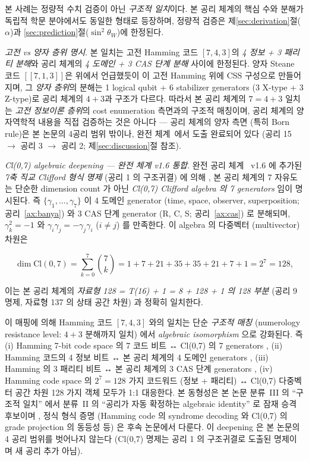 \documentclass[entropy,article,submit,pdftex,oneauthor]{Definitions/mdpi}
\begin{document}
본 사례는 정량적 수치 검증이 아닌 \emph{구조적 일치}이다. 본 공리 체계의 핵심 수와 분해가 독립적 학문 분야에서도 동일한 형태로 등장하며, 정량적 검증은 제\ref{sec:derivation}절($\alpha$)과 \ref{sec:prediction}절($\sin^2\theta_W$)에 한정된다.

\emph{고전 vs 양자 층위 명시}. 본 일치는 고전 Hamming 코드 $[7,4,3]$의 \emph{4 정보 + 3 패리티 분해}와 공리 체계의 \emph{4 도메인 + 3 CAS 단계 분해} 사이에 한정된다. 양자 Steane 코드 $[[7,1,3]]$은 위에서 언급했듯이 이 고전 Hamming 위에 CSS 구성으로 만들어지며, 그 \emph{양자 층위}의 분해는 1 logical qubit + 6 stabilizer generators (3 X-type + 3 Z-type)로 공리 체계의 $4+3$과 구조가 다르다. 따라서 본 공리 체계의 $7 = 4+3$ 일치는 \emph{고전 정보이론 층위}의 cost enumeration 측면과의 구조적 매칭이며, 공리 체계의 양자역학적 내용을 직접 검증하는 것은 아니다 --- 공리 체계의 양자 측면 (특히 Born rule)은 본 논문의 4공리 범위 밖이나, 완전 체계~\cite{han2026}에서 도출 완료되어 있다 (공리 15 $\to$ 공리 3 $\to$ 공리 2; 제\ref{sec:discussion}절 참조).

\emph{Cl(0,7) algebraic deepening — 완전 체계 v1.6 통합}. 완전 공리 체계~\cite{han2026} v1.6 에 추가된 \emph{7축 직교 Clifford 형식 명제} (공리 1 의 구조귀결) 에 의해 , 본 공리 체계의 7 자유도는 단순한 dimension count 가 아닌 \emph{Cl(0,7) Clifford algebra 의 7 generators} 임이 명시된다. 즉 $\{\gamma_1, \ldots, \gamma_7\}$ 이 4 도메인 generator (time, space, observer, superposition; 공리~\ref{ax:banya}) 와 3 CAS 단계 generator (R, C, S; 공리~\ref{ax:cas}) 로 분해되며, $\gamma_k^2 = -1$ 와 $\gamma_i \gamma_j = -\gamma_j \gamma_i$ ($i \ne j$) 를 만족한다. 이 algebra 의 다중벡터 (multivector) 차원은
\begin{linenomath}
\begin{equation}
\dim \mathrm{Cl}(0,7) = \sum_{k=0}^{7} \binom{7}{k} = 1 + 7 + 21 + 35 + 35 + 21 + 7 + 1 = 2^7 = 128,
\label{eq:cl7-dimension}
\end{equation}
\end{linenomath}
이는 본 공리 체계의 \emph{자료형 128 = T(16) + 1 = 8 + 128 + 1 의 128 부분} (공리 9 명제, 자료형 137 의 상태 공간 차원) 과 정확히 일치한다.

이 매핑에 의해 Hamming 코드 $[7,4,3]$ 와의 일치는 단순 \emph{구조적 매칭} (numerology resistance level: $4+3$ 분해까지 일치) 에서 \emph{algebraic isomorphism} 으로 강화된다. 즉 (i) Hamming 7-bit code space 의 7 코드 비트 ↔ Cl(0,7) 의 7 generators , (ii) Hamming 코드의 4 정보 비트 ↔ 본 공리 체계의 4 도메인 generators , (iii) Hamming 의 3 패리티 비트 ↔ 본 공리 체계의 3 CAS 단계 generators , (iv) Hamming code space 의 $2^7 = 128$ 가지 코드워드 (정보 + 패리티) ↔ Cl(0,7) 다중벡터 공간 차원 128 가지 객체 모두가 1:1 대응한다. 본 동형성은 본 논문 분류~III 의 ``구조적 일치'' 에서 분류~II 의 ``공리가 자동 확정하는 algebraic identity'' 로 잠재 승격 후보이며 , 정식 형식 증명 (Hamming code 의 syndrome decoding 와 Cl(0,7) 의 grade projection 의 동등성 등) 은 후속 논문에서 다룬다. 이 deepening 은 본 논문의 4 공리 범위를 벗어나지 않는다 (Cl(0,7) 명제는 공리 1 의 구조귀결로 도출된 명제이며 새 공리 추가 아님).
\end{document}
